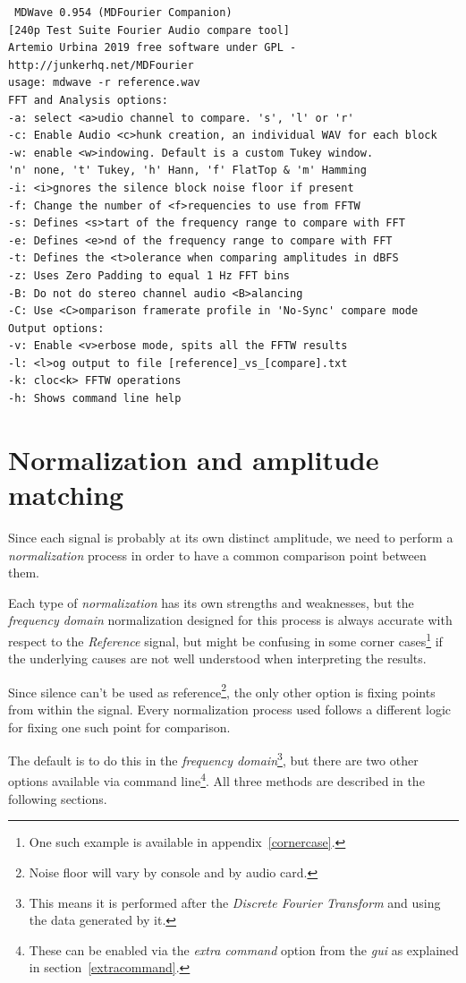 \documentclass[10pt,a4paper]{report}
\newcommand{\ac}[1]{\textit{\mbox{\acrshort{#1}}}}
\begin{document}
\begin{appendices}
\begin{verbatim}
 MDWave 0.954 (MDFourier Companion)
[240p Test Suite Fourier Audio compare tool]
Artemio Urbina 2019 free software under GPL - http://junkerhq.net/MDFourier
usage: mdwave -r reference.wav
FFT and Analysis options:
-a: select <a>udio channel to compare. 's', 'l' or 'r'
-c: Enable Audio <c>hunk creation, an individual WAV for each block
-w: enable <w>indowing. Default is a custom Tukey window.
'n' none, 't' Tukey, 'h' Hann, 'f' FlatTop & 'm' Hamming
-i: <i>gnores the silence block noise floor if present
-f: Change the number of <f>requencies to use from FFTW
-s: Defines <s>tart of the frequency range to compare with FFT
-e: Defines <e>nd of the frequency range to compare with FFT
-t: Defines the <t>olerance when comparing amplitudes in dBFS
-z: Uses Zero Padding to equal 1 Hz FFT bins
-B: Do not do stereo channel audio <B>alancing
-C: Use <C>omparison framerate profile in 'No-Sync' compare mode
Output options:
-v: Enable <v>erbose mode, spits all the FFTW results
-l: <l>og output to file [reference]_vs_[compare].txt
-k: cloc<k> FFTW operations
-h: Shows command line help
\end{verbatim}

\chapter{Normalization and amplitude matching}
\label{normalization}

Since each signal is probably at its own distinct amplitude, we need to perform a \textit{normalization} process in order to have a common comparison point between them.

Each type of \textit{normalization} has its own strengths and weaknesses, but the \textit{frequency domain} normalization designed for this process is always accurate with respect to the \textit{Reference} signal, but might be confusing in some corner cases\footnote{One such example is available in appendix~\ref{cornercase}.} if the underlying causes are not well understood when interpreting the results.

Since silence can't be used as reference\footnote{Noise floor will vary by console and by audio card.}, the only other option is fixing points from within the signal. Every normalization process used follows a different logic for fixing one such point for comparison.

The default is to do this in the \textit{frequency domain}\footnote{This means it is performed after the \textit{Discrete Fourier Transform} and using the data generated by it.}, but there are two other options available via command line\footnote{These can be enabled via the \textit{extra command} option from the \ac{gui} as explained in section~\ref{extracommand}.}. All three methods are described in the following sections.


\end{appendices}
\end{document}

